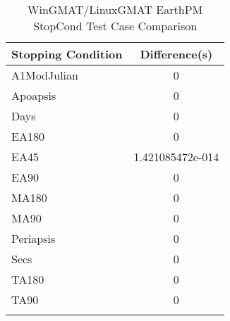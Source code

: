 \begin{table}[htbp!]
\centering
\caption{ WinGMAT/LinuxGMAT EarthPM StopCond Test Case Comparison}
      \begin{tabular}{lc}
      \hline\hline
          Stopping Condition & Difference(s) \\
         \hline
         A1ModJulian & 0 \\
         Apoapsis & 0 \\
         Days & 0 \\
         EA180 & 0 \\
         EA45 & 1.421085472e-014 \\
         EA90 & 0 \\
         MA180 & 0 \\
         MA90 & 0 \\
         Periapsis & 0 \\
         Secs & 0 \\
         TA180 & 0 \\
         TA90 & 0 \\
      \hline\hline
      \label{Table: WinGMAT-LinuxGMAT EarthPM StopCond Table} 
\end{tabular}
\end{table}
